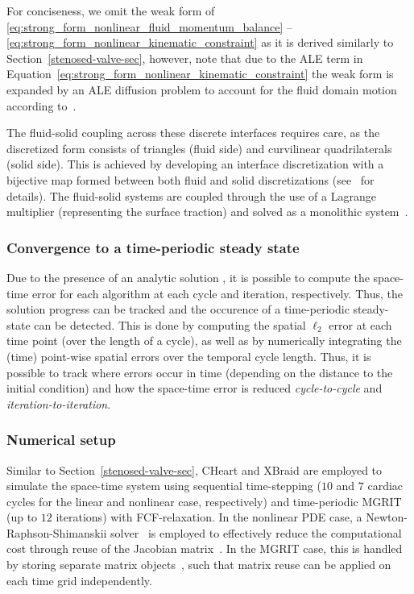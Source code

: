 \documentclass[3p]{elsarticle}
\begin{document}
For conciseness, we omit the weak form of
\eqref{eq:strong_form_nonlinear_fluid_momentum_balance} -- \eqref{eq:strong_form_nonlinear_kinematic_constraint}
as it is derived similarly to Section~\ref{stenosed-valve-sec},
however, note that due to the ALE term in Equation~\eqref{eq:strong_form_nonlinear_kinematic_constraint}
the weak form is expanded by an ALE diffusion problem to account for the fluid domain motion
according to~\cite[Equation~(85)]{HessenthalerBalmusRoehrleNordsletten2020}.

The fluid-solid coupling across these discrete interfaces requires care,
as the discretized form consists of triangles (fluid side)
and curvilinear quadrilaterals (solid side).
This is achieved by developing an interface discretization with a bijective map
formed between both fluid and solid discretizations
(see~\cite{NordslettenKaySmith2010} for details).
The fluid-solid systems are coupled through the use of a Lagrange multiplier
(representing the surface traction) and solved
as a monolithic system~\cite{NordslettenKaySmith2010,HessenthalerBalmusRoehrleNordsletten2020}.
\subsubsection{Convergence to a time-periodic steady state}
\label{analytic-steady-state-sec}
Due to the presence of an analytic solution \cite{HessenthalerBalmusRoehrleNordsletten2020},
it is possible to compute the space-time error for each algorithm
at each cycle and iteration, respectively.
Thus, the solution progress can be tracked
and the occurence of a time-periodic steady-state can be detected.
This is done by computing the spatial $\ell_2$ error
at each time point (over the length of a cycle),
as well as by numerically integrating the (time) point-wise spatial errors
over the temporal cycle length.
Thus, it is possible to track where errors occur in time (depending on the distance to the initial condition)
and how the space-time error is reduced \emph{cycle-to-cycle}
and \emph{iteration-to-iteration}.
\subsubsection{Numerical setup}
\label{analytic-numerical-setup-sec}
Similar to Section~\ref{stenosed-valve-sec}, CHeart and XBraid are employed
to simulate the space-time system using sequential time-stepping
($10$ and $7$ cardiac cycles for the linear and nonlinear case, respectively)
and time-periodic MGRIT (up to $12$ iterations) with FCF-relaxation.
In the nonlinear PDE case, a Newton-Raphson-Shimanskii solver~\cite{Shamanskii1967}
is employed to effectively reduce the computational cost
through reuse of the Jacobian matrix~\cite{HessenthalerRoehrleNordsletten2017}.
In the MGRIT case, this is handled by storing separate matrix objects~\cite{Hessenthaler2020_PhD},
such that matrix reuse can be applied on each time grid independently.
\end{document}
